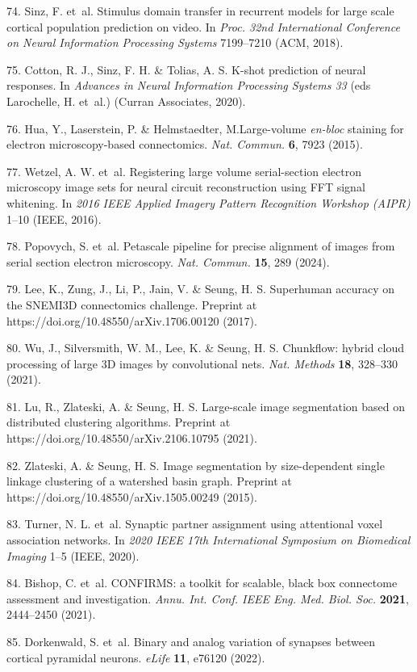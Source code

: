 \documentclass{article}
\begin{document}
\begin{hangpars}
74. Sinz, F. et~al. Stimulus domain transfer in recurrent models for large scale cortical population prediction on video. In \emph{Proc. 32nd International Conference on Neural Information Processing Systems} 7199–7210 (ACM, 2018). 

75. Cotton, R. J., Sinz, F. H. \& Tolias, A. S. K-shot prediction of neural responses. In \emph{Advances in Neural Information Processing Systems 33} (eds Larochelle, H. et~al.) (Curran Associates, 2020). 

76. Hua, Y., Laserstein, P. \& Helmstaedter, M.Large-volume \emph{en-bloc} staining for electron microscopy-based connectomics. \emph{Nat. Commun.} \textbf{6}, 7923 (2015). 

77. Wetzel, A. W. et~al. Registering large volume serial-section electron microscopy image sets for neural circuit reconstruction using FFT signal whitening. In \emph{2016 IEEE Applied Imagery Pattern Recognition Workshop (AIPR)} 1–10 (IEEE, 2016). 

78. Popovych, S. et~al. Petascale pipeline for precise alignment of images from serial section electron microscopy. \emph{Nat. Commun.} \textbf{15}, 289 (2024). 

79. Lee, K., Zung, J., Li, P., Jain, V. \& Seung, H. S. Superhuman accuracy on the SNEMI3D connectomics challenge. Preprint at https://doi.org/10.48550/arXiv.1706.00120 (2017). 

80. Wu, J., Silversmith, W. M., Lee, K. \& Seung, H. S. Chunkflow: hybrid cloud processing of large 3D images by convolutional nets. \emph{Nat. Methods} \textbf{18}, 328–330 (2021). 

81. Lu, R., Zlateski, A. \& Seung, H. S. Large-scale image segmentation based on distributed clustering algorithms. Preprint at https://doi.org/10.48550/arXiv.2106.10795 (2021). 

82. Zlateski, A. \& Seung, H. S. Image segmentation by size-dependent single linkage clustering of a watershed basin graph. Preprint at https://doi.org/10.48550/arXiv.1505.00249 (2015). 

83. Turner, N. L. et~al. Synaptic partner assignment using attentional voxel association networks. In \emph{2020 IEEE 17th International Symposium on Biomedical Imaging} 1–5 (IEEE, 2020). 

84. Bishop, C. et~al. CONFIRMS: a toolkit for scalable, black box connectome assessment and investigation. \emph{Annu. Int. Conf. IEEE Eng. Med. Biol. Soc.} \textbf{2021}, 2444–2450 (2021). 

85. Dorkenwald, S. et~al. Binary and analog variation of synapses between cortical pyramidal neurons. \emph{eLife} \textbf{11}, e76120 (2022). 


\end{hangpars}
\end{document}
